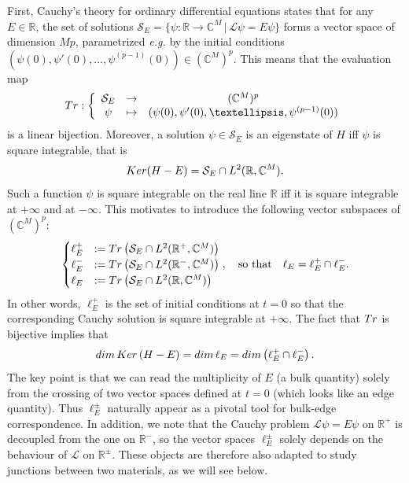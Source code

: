 \documentclass[11pt]{amsart}
\numberwithin{equation}{section} %
\newcommand\1{{\mathds 1}}
\def\C{{\mathbb C}}
\def\R{{\mathbb R}}
\def\cL{{\mathcal L}}
\def\cS{{\mathcal S}}
\def\Tr{{\rm Tr}}
\def\Ker{{\rm Ker }}
\def\dim{{\rm dim }}
\begin{document}
First, Cauchy's theory for ordinary differential equations states that for any $E \in \R$, the set of solutions $\cS_E=\{ \psi : \R \to \C^M \, | \, \cL \psi = E \psi\}$ forms a vector space of dimension $Mp$, parametrized {\em e.g.} by the initial conditions $(\psi(0), \psi'(0), \ldots, \psi^{(p-1)}(0)) \in (\C^M)^p$. This means that the evaluation map
\begin{equation} \label{eq:def:Tr}
    \Tr : \left\lbrace \begin{array}{ccc} \cS_E & \to  & (\C^M)^p\\  \psi &\mapsto &(\psi(0), \psi'(0), \ldots, \psi^{(p-1)}(0)) \end{array} \right.
\end{equation}
is a linear bijection. Moreover, a solution $\psi \in \cS_E$ is an eigenstate of $H$ iff $\psi$ is square integrable, that is
\[
    \Ker(H - E) = \cS_E \cap L^2(\R, \C^M).
\]
Such a function $\psi$ is square integrable on the real line $\R$ iff it is square integrable at $+ \infty$ and at $-\infty$. This motivates to introduce the following vector subspaces of $(\C^M)^p$:
\begin{equation} \label{eq:def:ell_E}
    \begin{cases}
        \ell_E^+ & := \Tr \left(  \cS_E \cap L^2(\R^+, \C^M) \right) \\ 
        \ell_E^- & := \Tr \left(  \cS_E \cap L^2(\R^-, \C^M) \right) \\ 
        \ell_E & :=  \Tr \left(  \cS_E \cap L^2(\R, \C^M) \right)
    \end{cases},
    \quad \text{so that} \quad \ell_E = \ell_E^+ \cap \ell_E^-.
\end{equation}
In other words, $\ell_E^+$ is the set of initial conditions at $t=0$ so that the corresponding Cauchy solution is square integrable at $+ \infty$. The fact that $\Tr$ is bijective implies that
\[
    \dim \,  \Ker \, (H - E) = \dim \, \ell_E = \dim \left( \ell_E^+ \cap \ell_E^- \right).
\]
The key point is that we can read the multiplicity of $E$ (a bulk quantity) solely from the crossing of two vector spaces defined at $t=0$ (which looks like an edge quantity). Thus $\ell_E^\pm$ naturally appear as a pivotal tool for bulk-edge correspondence. In addition, we note that the Cauchy problem $\cL \psi = E \psi$ on $\R^+$ is decoupled from the one on $\R^-$, so the vector spaces $\ell_E^\pm$ solely depends on the behaviour of $\cL$ on $\R^\pm$. These objects are therefore also adapted to study junctions between two materials, as we will see below.
\end{document}
